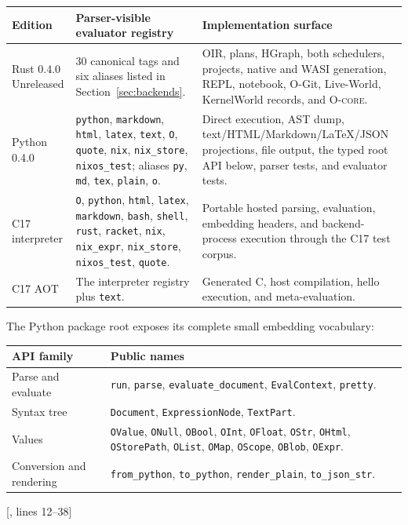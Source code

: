 \documentclass[11pt,oneside]{article}
\newcommand{\ocore}{\textsc{O-core}}
\newcommand{\src}[2]{\textcolor{OSlate}{\scriptsize[\path{#1}, lines #2]}\allowbreak}
\begin{document}
\begin{longtable}{P{0.18\textwidth} P{0.34\textwidth} P{0.40\textwidth}}
\toprule
\textbf{Edition} & \textbf{Parser-visible evaluator registry} &
\textbf{Implementation surface} \\
\midrule
\endhead
Rust 0.4.0 Unreleased &
30 canonical tags and six aliases listed in Section~\ref{sec:backends}. &
OIR, plans, HGraph, both schedulers, projects, native and WASI generation,
REPL, notebook, O-Git, Live-World, KernelWorld records, and \ocore{}. \\
Python 0.4.0 &
\texttt{python}, \texttt{markdown}, \texttt{html}, \texttt{latex},
\texttt{text}, \texttt{O}, \texttt{quote}, \texttt{nix},
\texttt{nix\_store}, \texttt{nixos\_test}; aliases \texttt{py},
\texttt{md}, \texttt{tex}, \texttt{plain}, \texttt{o}. &
Direct execution, AST dump, text/HTML/Markdown/LaTeX/JSON projections,
file output, the typed root API below, parser tests, and evaluator tests. \\
C17 interpreter &
\texttt{O}, \texttt{python}, \texttt{html}, \texttt{latex},
\texttt{markdown}, \texttt{bash}, \texttt{shell}, \texttt{rust},
\texttt{racket}, \texttt{nix}, \texttt{nix\_expr},
\texttt{nix\_store}, \texttt{nixos\_test}, \texttt{quote}. &
Portable hosted parsing, evaluation, embedding headers, and backend-process
execution through the C17 test corpus. \\
C17 AOT &
The interpreter registry plus \texttt{text}. &
Generated C, host compilation, hello execution, and meta-evaluation. \\
\bottomrule
\end{longtable}

The Python package root exposes its complete small embedding vocabulary:

\begin{longtable}{P{0.20\textwidth} P{0.72\textwidth}}
\toprule
\textbf{API family} & \textbf{Public names} \\
\midrule
\endhead
Parse and evaluate & \texttt{run}, \texttt{parse},
\texttt{evaluate\_document}, \texttt{EvalContext}, \texttt{pretty}. \\
Syntax tree & \texttt{Document}, \texttt{ExpressionNode}, \texttt{TextPart}. \\
Values & \texttt{OValue}, \texttt{ONull}, \texttt{OBool}, \texttt{OInt},
\texttt{OFloat}, \texttt{OStr}, \texttt{OHtml}, \texttt{OStorePath},
\texttt{OList}, \texttt{OMap}, \texttt{OScope}, \texttt{OBlob},
\texttt{OExpr}. \\
Conversion and rendering & \texttt{from\_python}, \texttt{to\_python},
\texttt{render\_plain}, \texttt{to\_json\_str}. \\
\bottomrule
\end{longtable}
\src{o_lang/__init__.py}{12--38}
\end{document}
